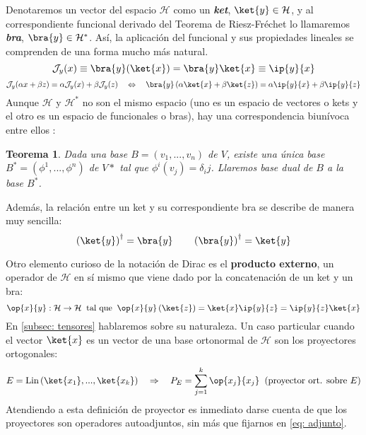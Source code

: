 \documentclass[11pt,a4paper,twoside,pdf]{article}
\numberwithin{equation}{section}
\newtheorem{theorem}{Teorema}
\begin{document}
		Denotaremos un vector del espacio $\mathcal{H}$ como un \textbf{\textit{ket}}, $\ket{y}\in \mathcal{H}$, y al correspondiente funcional derivado del Teorema de Riesz-Fréchet lo llamaremos \textbf{\textit{bra}}, $\bra{y}\in \mathcal{H}^*$. Así, la aplicación del funcional y sus propiedades lineales se comprenden de una forma mucho más natural.
			\begin{equation}
				\mathcal{J}_y (x) \equiv \bra{y} (\ket{x}) = \bra{y} \ket{x} \equiv \ip{y}{x}
			\end{equation}
			\begin{equation}
				\mathcal{J}_y (\alpha x + \beta z) = \alpha \mathcal{J}_y(x) + \beta \mathcal{J}_y(z)
				\quad \Leftrightarrow \quad \bra{y}\left( \alpha \ket{x} + \beta \ket{z} \right) = \alpha \ip{y}{x} + \beta \ip{y}{z}
			\end{equation}
		Aunque $\mathcal{H}$ y $\mathcal{H}^*$ no son el mismo espacio (uno es un espacio de vectores o kets y el otro es un espacio de funcionales o bras), hay una correspondencia biunívoca entre ellos \cite{AlgebraII}:
			\begin{theorem}
				Dada una base $B=(v_1,...,v_n)$ de $V$, existe una única base $B^*=(\phi^1,...,\phi^n)$ de $V*$ tal que $\phi^i(v_j)=\delta_ij$. Llaremos base dual de $B$ a la base $B^*$. 
			\end{theorem}
		Además, la relación entre un ket y su correspondiente bra se describe de manera muy sencilla:
			\begin{equation} \label{eq: adjunto}
				\left( \ket{y} \right)^\dagger =\bra{y} \qquad \left( \bra{y} \right)^\dagger =\ket{y}
			\end{equation}
	
		Otro elemento curioso de la notación de Dirac es el \textbf{producto externo}, un operador de $\mathcal{H}$ en sí mismo que viene dado por la concatenación de un ket y un bra:
			\begin{equation} \label{eq: producto externo}
				\op{x}{y} : \mathcal{H} \rightarrow \mathcal{H} \: \text{ tal que } \: \op{x}{y} \left( \ket{z} \right) = \ket{x} \ip{y}{z} = \ip{y}{z} \ket{x} 
			\end{equation} 
		En \ref{subsec: tensores} hablaremos sobre su naturaleza. Un caso particular cuando el vector $\ket{x}$ es un vector de una base ortonormal de $\mathcal{H}$ son los proyectores ortogonales:
			\begin{equation}
				E=\text{Lin}\left( \ket{x_1},...,\ket{x_k} \right) \quad \Rightarrow \quad P_E = \displaystyle\sum_{j=1}^{k} \op{x_j}{x_j} \: \text{ (proyector ort. sobre $E$)}
			\end{equation}
		Atendiendo a esta definición de proyector es inmediato darse cuenta de que los proyectores son operadores autoadjuntos, sin más que fijarnos en \eqref{eq: adjunto}.
		
\end{document}
